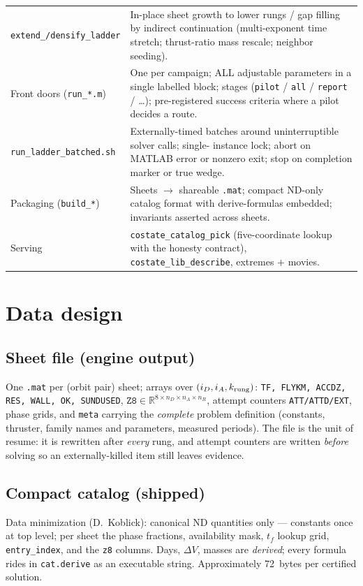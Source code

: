 \documentclass[11pt]{article}
\begin{document}
\begin{longtable}{p{}p{}}
\texttt{extend\_/densify\_ladder} &
In-place sheet growth to lower rungs / gap filling by indirect
continuation (multi-exponent time stretch; thrust-ratio mass rescale;
neighbor seeding).\\
Front doors (\texttt{run\_*.m}) &
One per campaign; ALL adjustable parameters in a single labelled block;
stages (\texttt{pilot} / \texttt{all} / \texttt{report} / \dots);
pre-registered success criteria where a pilot decides a route.\\
\texttt{run\_ladder\_batched.sh} &
Externally-timed batches around uninterruptible solver calls; single-
instance lock; abort on MATLAB error or nonzero exit; stop on completion
marker or true wedge.\\
Packaging (\texttt{build\_*}) &
Sheets $\to$ shareable \texttt{.mat}; compact ND-only catalog format with
derive-formulas embedded; invariants asserted across sheets.\\
Serving &
\texttt{costate\_catalog\_pick} (five-coordinate lookup with the honesty
contract), \texttt{costate\_lib\_describe}, extremes $+$ movies.\\
\bottomrule
\end{longtable}

\section{Data design}

\subsection{Sheet file (engine output)}

One \texttt{.mat} per (orbit pair) sheet; arrays over
$(i_D, i_A, k_{\rm rung})$:
\texttt{TF, FLYKM, ACCDZ, RES, WALL, OK, SUNDUSED},
$\texttt{Z8}\in\mathbb{R}^{8\times n_D\times n_A\times n_R}$, attempt
counters \texttt{ATT/ATTD/EXT}, phase grids, and \texttt{meta} carrying the
\emph{complete} problem definition (constants, thruster, family names and
parameters, measured periods). The file is the unit of resume: it is
rewritten after \emph{every} rung, and attempt counters are written
\emph{before} solving so an externally-killed item still leaves evidence.

\subsection{Compact catalog (shipped)}

Data minimization (D.~Koblick): canonical ND quantities only ---
constants once at top level; per sheet the phase fractions, availability
mask, $t_f$ lookup grid, \texttt{entry\_index}, and the \texttt{z8}
columns. Days, $\Delta V$, masses are \emph{derived}; every formula rides
in \texttt{cat.derive} as an executable string. Approximately 72~bytes per
certified solution.
\end{document}
